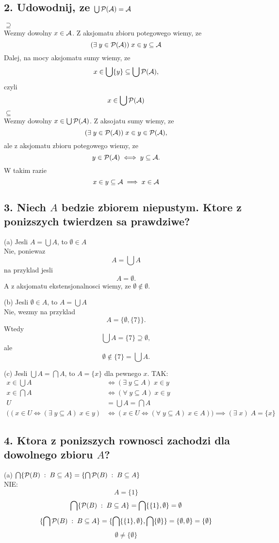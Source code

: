 \documentclass{article}
\begin{document}
\ttfamily
\subsection*{2. Udowodnij, ze $\bigcup\mathcal{P}(\mathcal{A}) = \mathcal{A}$}
$\supseteq$\smallskip\\
Wezmy dowolny $x\in\mathcal{A}$. Z aksjomatu zbioru potegowego wiemy, ze
$$(\exists\;y\in\mathcal{P}(\mathcal{A}))\;x\in y\subseteq \mathcal{A}$$
Dalej, na mocy aksjomatu sumy wiemy, ze
$$x\in\bigcup\{y\}\subseteq \bigcup\mathcal{P}(\mathcal{A}),$$
czyli
$$x\in\bigcup\mathcal{P}(\mathcal{A})$$
$\subseteq$\smallskip\\
Wezmy dowolny $x\in\bigcup\mathcal{P}(\mathcal{A})$. Z aksojatu sumy wiemy, ze
$$(\exists\;y\in\mathcal{P}(\mathcal{A}))\;x\in y\in\mathcal{P}(\mathcal{A}),$$
ale z aksjomatu zbioru potegowego wiemy, ze
$$y\in\mathcal{P}(\mathcal{A})\iff y\subseteq\mathcal{A}.$$
W takim razie
$$x\in y\subseteq\mathcal{A}\implies x\in\mathcal{A}$$
\kondow

\subsection*{3. Niech $A$ bedzie zbiorem niepustym. Ktore z ponizszych twierdzen sa prawdziwe?}
\indent (a) Jesli $A=\bigcup A$, to $\emptyset\in A$\smallskip\\
Nie, poniewaz
$$A=\bigcup A$$
na przyklad jesli 
$$A=\emptyset.$$
A z aksjomatu ekstensjonalnosci wiemy, ze $\emptyset\notin\emptyset$.

\indent (b) Jesli $\emptyset\in A$, to $A=\bigcup A$\smallskip\\
Nie, wezmy na przyklad
$$A=\{\emptyset, \{7\}\}.$$
Wtedy
$$\bigcup A=\{7\}\supseteq\emptyset,$$
ale
$$\emptyset\notin\{7\}=\bigcup A.$$

\indent (c) Jesli $\bigcup A=\bigcap A$, to $A=\{x\}$ dla pewnego $x$.
TAK:\smallskip\\
\begin{align*}
    x\in \bigcup A&\iff(\exists\;y\subseteq A)\;x\in y\\
    x\in \bigcap A&\iff(\forall\;y\subseteq A)\;x\in y\\
    U&=\bigcup A=\bigcap A\\
    ((x\in U\iff(\exists\;y\subseteq A)\;x\in y)&\iff(x\in U\iff(\forall\;y\subseteq A)\;x\in A))\implies (\exists\;x)\;A=\{x\}
\end{align*}

\subsection*{4. Ktora z ponizszych rownosci zachodzi dla dowolnego zbioru $A$?}
\indent (a) $\bigcap\{\mathcal{P}(B)\;:\;B\subseteq A\}=\{\bigcap\mathcal{P}(B)\;:\;B\subseteq A\}$\smallskip\\
NIE:\smallskip\\
$$A=\{1\}$$
$$\bigcap \{\mathcal{P}(B)\;:\;B\subseteq A\}=\bigcap\{\{1\}, \emptyset\}=\emptyset$$
$$\{\bigcap\mathcal{P}(B)\;:\;B\subseteq A\}=\{\bigcap\{\{1\}, \emptyset\}, \bigcap\{\emptyset\}\}=\{\emptyset, \emptyset\}=\{\emptyset\}$$
$$\emptyset\neq\{\emptyset\}$$
\end{document}
